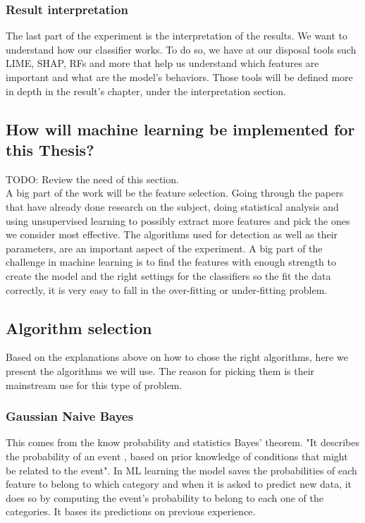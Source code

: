 \subsubsection{Result interpretation}
The last part of the experiment is the interpretation of the results. We want to understand how our classifier works. To do so, we have at our disposal tools such LIME, SHAP, RFs and more that help us understand which features are important and what are the model's behaviors\cite{ml-inter}.
Those tools will be defined more in depth in the result's chapter, under the interpretation section.

\subsection{How will machine learning be implemented for this Thesis?}
TODO: Review the need of this section.\\
A big part of the work will be the feature selection. Going through the papers that have already done research on the subject, doing statistical analysis and using unsupervised learning to possibly extract more features and pick the ones we consider most effective. The algorithms used for detection as well as their parameters, are an important aspect of the experiment. A big part of the challenge in machine learning is to find the features with enough strength to create the model and the right settings for the classifiers so the fit the data correctly, it is very easy to fall in the over-fitting or under-fitting problem.

\subsection{Algorithm selection}
Based on the explanations above on how to chose the right algorithms, here we present the algorithms we will use. The reason for picking them is their mainstream use for this type of problem.

\subsubsection{Gaussian Naive Bayes}
This comes from the know probability and statistics Bayes' theorem. "It describes the probability of an event , based on prior knowledge of conditions that might be related to the event"\cite{bayes}. In ML learning the model saves the probabilities of each feature to belong to which category and when it is asked to predict new data, it does so by computing the event's probability to belong to each one of the categories. It bases its predictions on previous experience.

